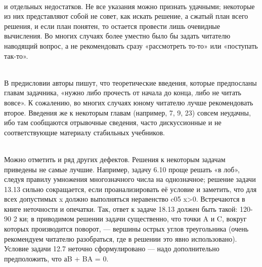 \documentclass[a4paper,12pt]{article}
\begin{document}
\begin{multicols}{3}
\footnotesize
\\ и отдельных недостатков. Не все указания можно признать удачными; некоторые из них представляют собой не совет, как искать решение, а сжатый план всего решения, и если план понятен, то остается провести лишь очевидные вычисления. Во многих случаях более уместно было бы задать читателю наводящий вопрос, а не рекомендовать сразу «рассмотреть то-то» или «поступать так-то».

\\В предисловии авторы пишут, что теоретические введения, которые предпосланы главам задачника, «нужно либо прочесть от начала до конца, либо не читать вовсе». К сожалению, во многих случаях юному читателю лучше рекомендовать второе. Введения же к некоторым главам (например, 7, 9, 23) совсем неудачны, ибо там сообщаются отрывочные сведения, часто дискуссионные и не соответствующие материалу стабильных учебников.

\\Можно отметить и ряд других дефектов. Решения к некоторым задачам приведены не самые лучшие. Например, задачу 6.10 проще решать «в лоб», следуя правилу умножения многозначного числа на однозначное; решение задачи 13.13 сильно сокращается, если проанализировать её условие и заметить, что для всех допустимых x должно выполняться неравенство c05 x>0. Встречаются в книге неточности и опечатки. Так, ответ к задаче 18.13 должен быть такой: 120-90 2 ки; в приводимом решении задачи существенно, что точки A и C, вокруг которых производится поворот, — вершины острых углов треугольника (очень рекомендуем читателю разобраться, где в решении это явно использовано). Условие задачи 12.7 неточно сформулировано — надо дополнительно предположить, что аB + BA = 0.


\end{multicols}
\end{document}
